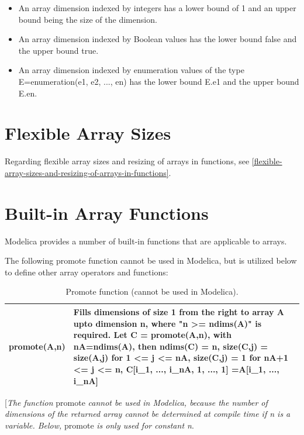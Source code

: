 \documentclass[10pt,a4paper]{report}
\def\doublelabel#1{\label{#1}\hypertarget{#1}{}}
\begin{document}
\begin{itemize}
\item
  An array dimension indexed by integers has a lower bound of 1 and an
  upper bound being the size of the dimension.
\item
  An array dimension indexed by Boolean values has the lower bound false
  and the upper bound true.
\item
  An array dimension indexed by enumeration values of the type
  E=enumeration(e1, e2, ..., en) has the lower bound E.e1 and the upper
  bound E.en.
\end{itemize}

\section{Flexible Array Sizes}\doublelabel{flexible-array-sizes}

Regarding flexible array sizes and resizing of arrays in functions, see
\ref{flexible-array-sizes-and-resizing-of-arrays-in-functions}.

\section{Built-in Array Functions}\doublelabel{built-in-array-functions}

Modelica provides a number of built-in functions that are applicable to
arrays.

The following promote function cannot be used in Modelica, but is
utilized below to define other array operators and functions:

\begin{longtable}[]{|l|p{9cm}|}
\caption{Promote function (cannot be used in Modelica).}\\
\hline
\endhead
promote(A,n) & Fills dimensions of size 1 from the right to array A upto
dimension n, where "n \textgreater{}= ndims(A)" is required. Let C =
promote(A,n), with nA=ndims(A), then ndims(C) = n, size(C,j) = size(A,j)
for 1 \textless{}= j \textless{}= nA, size(C,j) = 1 for nA+1 <= j <= n, C{[}i\_1, ..., i\_nA, 1, ..., 1{]} =A{[}i\_1, ..., i\_nA{]}\\ \hline
\end{longtable}

{[}\emph{The function} promote \emph{cannot be used in Modelica, because
the number of dimensions of the returned array cannot be determined at
compile time if n is a variable. Below,} promote \emph{is only used for
constant n}.
\end{document}
